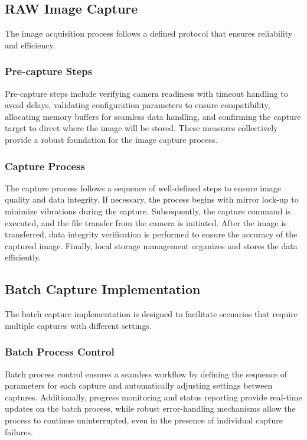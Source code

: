 \subsection{RAW Image Capture}
The image acquisition process follows a defined protocol that ensures reliability and efficiency.

\subsubsection{Pre-capture Steps}
Pre-capture steps include verifying camera readiness with timeout handling to avoid delays, validating configuration parameters to ensure compatibility, allocating memory buffers for seamless data handling, and confirming the capture target to direct where the image will be stored. These measures collectively provide a robust foundation for the image capture process.

\subsubsection{Capture Process}
The capture process follows a sequence of well-defined steps to ensure image quality and data integrity. If necessary, the process begins with mirror lock-up to minimize vibrations during the capture. Subsequently, the capture command is executed, and the file transfer from the camera is initiated. After the image is transferred, data integrity verification is performed to ensure the accuracy of the captured image. Finally, local storage management organizes and stores the data efficiently.

\subsection{Batch Capture Implementation}
The batch capture implementation is designed to facilitate scenarios that require multiple captures with different settings.

\subsubsection{Batch Process Control}
 Batch process control ensures a seamless workflow by defining the sequence of parameters for each capture and automatically adjusting settings between captures. Additionally, progress monitoring and status reporting provide real-time updates on the batch process, while robust error-handling mechanisms allow the process to continue uninterrupted, even in the presence of individual capture failures.

